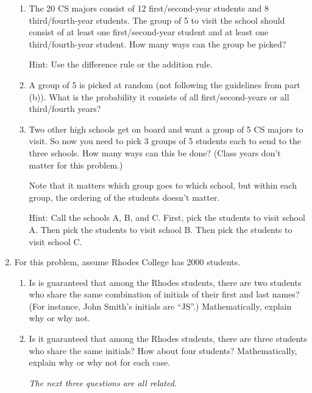 \documentclass[11pt, letterpaper]{report}
\begin{document}
\begin{enumerate}
\begin{enumerate}
        
        
        \item The 20 CS majors consist of 12 first/second-year students and 8 third/fourth-year students.
        The group of 5 to visit the school should consist of at least one first/second-year student
        and at least one third/fourth-year student.  How many ways can the group be picked?
        
        Hint: Use the difference rule or the addition rule.
        

        
        \item A group of 5 is picked at random (not following the guidelines from part (b)).  What is the probability it consists of all first/second-years or all third/fourth years?
 

        \item Two other high schools get on board and want a group of 5 CS majors to visit.
        So now you need to pick 3 groups of 5 students each to send to the three schools.  How many ways can this be done?  (Class years don't matter for this problem.)

        Note that it matters which group goes to which school, but within each group, the ordering
        of the students doesn't matter. 
        
        Hint: Call the schools A, B, and C.  First, pick the students to visit school A.
        Then pick the students to visit school B.  Then pick the students to visit school C.
\end{enumerate}


\item For this problem, assume Rhodes College has 2000 students.
\begin{enumerate}
	\item Is is guaranteed that among the Rhodes students, there are two students
	who share the same combination of initials of their first and last names?  (For instance,
	John Smith's initials are ``JS''.) Mathematically, explain why or why not.
	\item Is it guaranteed that among the Rhodes students, there are three students
	who share the same initials?  How about four students?  Mathematically, explain why or why not for each
	case.
	\vspace{.1in}
	
	 \emph{The next three questions are all related.}
	 
	 \vspace{.1in}
	

\end{enumerate}
\end{enumerate}
\end{document}
